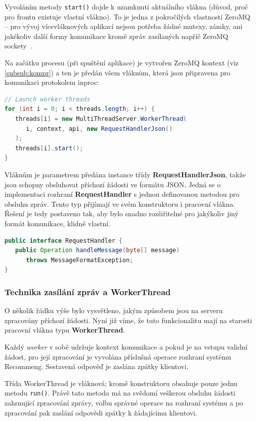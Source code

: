 \documentclass[thesis=M,czech]{FITthesis}[2014/05/07]
\begin{document}
Vyvoláním metody \texttt{start()} dojde k uzamknutí aktuálního vlákna (důvod, proč pro frontu existuje vlastní vlákno). To je jedna z pokročilých vlastností ZeroMQ – pro vývoj vícevláknových aplikací nejsou potřeba žádné mutexy, zámky, ani jakékoliv další formy komunikace kromě zpráv zasílaných napříč ZeroMQ sockety~\cite{mtserver}.

Na začátku procesu (při spuštění aplikace) je vytvořen ZeroMQ kontext (viz \ref{subsub:kompr}) a ten je předán všem vláknům, která jsou připravena pro komunikaci protokolem inproc:

\begin{lstlisting}[language=java]
// Launch worker threads
for (int i = 0; i < threads.length; i++) {
   threads[i] = new MultiThreadServer.WorkerThread(
      i, context, api, new RequestHandlerJson()
   );
   threads[i].start();
}
\end{lstlisting}

Vláknům je parametrem předána instance třídy \textbf{RequestHandlerJson}, takže jsou schopny obsluhovat příchozí žádosti ve formátu JSON. Jedná se o implementaci rozhraní \textbf{RequestHandler} s jednou definovanou metodou pro obsluhu zpráv. Tento typ přijímají ve svém konstruktoru i pracovní vlákna. Řešení je tedy postaveno tak, aby bylo snadno rozšiřitelné pro jakýkoliv jiný formát komunikace, klidně vlastní.

\begin{lstlisting}[language=java]
public interface RequestHandler {
   public Operation handleMessage(byte[] message)
      throws MessageFormatException;
}
\end{lstlisting}

\subsubsection{Technika zasílání zpráv a WorkerThread}
O několik řádku výše bylo vysvětleno, jakým způsobem jsou na serveru zpracovány příchozí žádosti. Nyní již víme, že tuto funkcionalitu mají na starosti pracovní vlákna typu \textbf{WorkerThread}.

Každý \emph{worker} v sobě udržuje kontext komunikace a pokud je na vstupu validní žádost, pro její zpracování je vyvolána příslušná operace rozhraní systému Recommeng. Sestavená odpověď je zaslána zpátky klientovi.

Třída WorkerThread je vláknová; kromě konstruktoru obsahuje pouze jednu metodu \texttt{run()}. Právě tato metoda má na svědomí veškerou obsluhu žádosti zahrnující zpracování zprávy, volbu správné operace na rozhraní systému a po zpracování pak zaslání odpovědi zpátky k žádajícímu klientovi.
\end{document}

